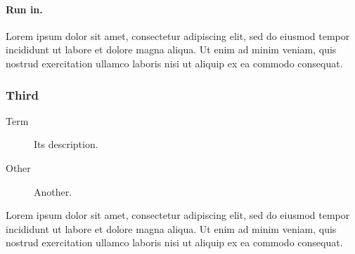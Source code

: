 \documentclass{article}
\begin{document}
\paragraph{Run in.} Lorem ipsum dolor sit amet, consectetur adipiscing elit, sed do eiusmod tempor incididunt ut labore et dolore magna aliqua. Ut enim ad minim veniam, quis nostrud exercitation ullamco laboris nisi ut aliquip ex ea commodo consequat.
\subsubsection*{Third}
\begin{description}\item[Term] Its description.\item[Other] Another.\end{description}
Lorem ipsum dolor sit amet, consectetur adipiscing elit, sed do eiusmod tempor incididunt ut labore et dolore magna aliqua. Ut enim ad minim veniam, quis nostrud exercitation ullamco laboris nisi ut aliquip ex ea commodo consequat.
\end{document}
